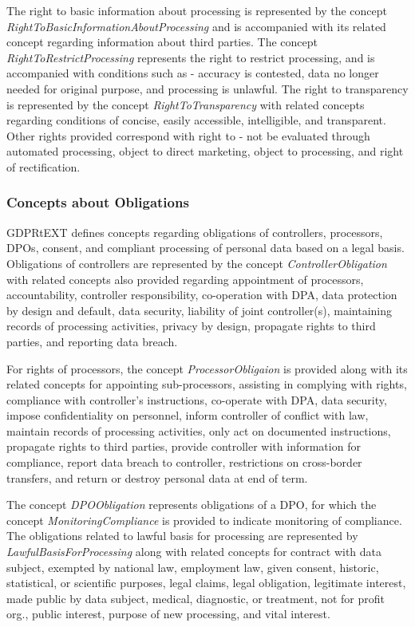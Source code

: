 The right to basic information about processing is represented by the concept \textit{RightToBasicInformationAboutProcessing} and is accompanied with its related concept regarding information about third parties. The concept \textit{RightToRestrictProcessing} represents the right to restrict processing, and is accompanied with conditions such as - accuracy is contested, data no longer needed for original purpose, and processing is unlawful. The right to transparency is represented by the concept \textit{RightToTransparency} with related concepts regarding conditions of concise, easily accessible, intelligible, and transparent. Other rights provided correspond with right to - not be evaluated through automated processing, object to direct marketing,  object to processing, and right of rectification.

\subsubsection{Concepts about Obligations}
GDPRtEXT defines concepts regarding obligations of controllers, processors, DPOs, consent, and compliant processing of personal data based on a legal basis. Obligations of controllers are represented by the concept \textit{ControllerObligation} with related concepts also provided regarding  appointment of processors, accountability, controller responsibility, co-operation with DPA, data protection by design and default, data security, liability of joint controller(s), maintaining records of processing activities, privacy by design, propagate rights to third parties, and reporting data breach.

For rights of processors, the concept \textit{ProcessorObligaion} is provided along with its related concepts for appointing sub-processors, assisting in complying with rights, compliance with controller's instructions, co-operate with DPA, data security, impose confidentiality on personnel, inform controller of conflict with law, maintain records of processing activities, only act on documented instructions, propagate rights to third parties, provide controller with information for compliance, report data breach to controller, restrictions on cross-border transfers, and return or destroy personal data at end of term.

The concept \textit{DPOObligation} represents obligations of a DPO, for which the concept \textit{MonitoringCompliance} is provided to indicate monitoring of compliance. The obligations related to lawful basis for processing are represented by \textit{LawfulBasisForProcessing} along with related concepts for contract with data subject, exempted by national law, employment law, given consent, historic, statistical, or scientific purposes, legal claims, legal obligation, legitimate interest, made public by data subject, medical, diagnostic, or treatment, not for profit org., public interest, purpose of new processing, and vital interest.

